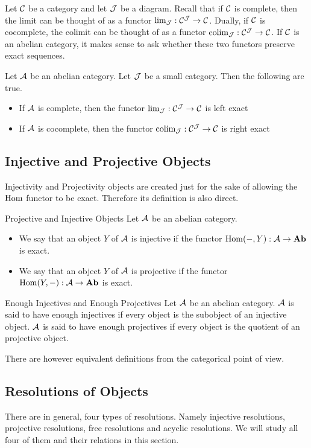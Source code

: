 \documentclass[a4paper]{article}
\begin{document}
Let $\mathcal{C}$ be a category and let $\mathcal{J}$ be a diagram. Recall that if $\mathcal{C}$ is complete, then the limit can be thought of as a functor $\lim_{\mathcal{J}}:\mathcal{C}^{\mathcal{J}}\to\mathcal{C}$. Dually, if $\mathcal{C}$ is cocomplete, the colimit can be thought of as a functor $\operatorname*{colim}_{\mathcal{J}}:\mathcal{C}^{\mathcal{J}}\to\mathcal{C}$. If $\mathcal{C}$ is an abelian category, it makes sense to ask whether these two functors preserve exact sequences. 

\begin{thm}{}{} Let $\mathcal{A}$ be an abelian category. Let $\mathcal{J}$ be a small category. Then the following are true. 
\begin{itemize}
\item If $\mathcal{A}$ is complete, then the functor $\lim_{\mathcal{J}}:\mathcal{C}^{\mathcal{J}}\to\mathcal{C}$ is left exact
\item If $\mathcal{A}$ is cocomplete, then the functor $\operatorname*{colim}_{\mathcal{J}}:\mathcal{C}^{\mathcal{J}}\to\mathcal{C}$ is right exact
\end{itemize}
\end{thm}

\subsection{Injective and Projective Objects}
Injectivity and Projectivity objects are created just for the sake of allowing the $\operatorname{Hom}$ functor to be exact. Therefore its definition is also direct. 

\begin{defn}{Projective and Injective Objects}{} Let $\mathcal{A}$ be an abelian category. 
\begin{itemize}
\item We say that an object $Y$ of $\mathcal{A}$ is injective if the functor $\operatorname{Hom}(-,Y):\mathcal{A}\to\bold{Ab}$ is exact. 
\item We say that an object $Y$ of $\mathcal{A}$ is projective if the functor $\operatorname{Hom}(Y,-):\mathcal{A}\to\bold{Ab}$ is exact. 
\end{itemize}
\end{defn}

\begin{defn}{Enough Injectives and Enough Projectives}{} Let $\mathcal{A}$ be an abelian category. $\mathcal{A}$ is said to have enough injectives if every object is the subobject of an injective object. $\mathcal{A}$ is said to have enough projectives if every object is the quotient of an projective object. 
\end{defn}

There are however equivalent definitions from the categorical point of view. 

\subsection{Resolutions of Objects}
There are in general, four types of resolutions. Namely injective resolutions, projective resolutions, free resolutions and acyclic resolutions. We will study all four of them and their relations in this section. 
\end{document}
